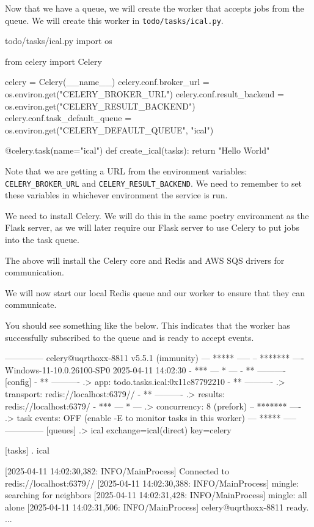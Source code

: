 \documentclass{csse4400}
\begin{document}
\noindent
Now that we have a queue,
we will create the worker that accepts jobs from the queue.
We will create this worker in \texttt{todo/tasks/ical.py}.
%
\begin{code}[language=python,numbers=none]{todo/tasks/ical.py}
import os

from celery import Celery

celery = Celery(__name__)
celery.conf.broker_url = os.environ.get("CELERY_BROKER_URL")
celery.conf.result_backend = os.environ.get("CELERY_RESULT_BACKEND")
celery.conf.task_default_queue = os.environ.get("CELERY_DEFAULT_QUEUE", "ical")

@celery.task(name="ical")
def create_ical(tasks):
    return "Hello World"
\end{code}

\noindent
Note that we are getting a URL from the environment variables:
\texttt{CELERY\_BROKER\_URL} and \texttt{CELERY\_RESULT\_BACKEND}.
We need to remember to set these variables in whichever environment the service is run.

We need to install Celery.
We will do this in the same poetry environment as the Flask server,
as we will later require our Flask server to use Celery to put jobs into the task queue.


\noindent
The above will install the Celery core and Redis and AWS SQS drivers for communication.

We will now start our local Redis queue and our worker to ensure that they can communicate.



You should see something like the below.
This indicates that the worker has successfully subscribed to the queue and is ready to accept events.
%
\begin{code}[numbers=none]{}
 -------------- celery@uqrthoxx-8811 v5.5.1 (immunity)
--- ***** -----
-- ******* ---- Windows-11-10.0.26100-SP0 2025-04-11 14:02:30
- *** --- * ---
- ** ---------- [config]
- ** ---------- .> app:         todo.tasks.ical:0x11c87792210
- ** ---------- .> transport:   redis://localhost:6379//
- ** ---------- .> results:     redis://localhost:6379/
- *** --- * --- .> concurrency: 8 (prefork)
-- ******* ---- .> task events: OFF (enable -E to monitor tasks in this worker)
--- ***** -----
 -------------- [queues]
                .> ical             exchange=ical(direct) key=celery


[tasks]
  . ical

[2025-04-11 14:02:30,382: INFO/MainProcess] Connected to redis://localhost:6379//
[2025-04-11 14:02:30,388: INFO/MainProcess] mingle: searching for neighbors
[2025-04-11 14:02:31,428: INFO/MainProcess] mingle: all alone
[2025-04-11 14:02:31,506: INFO/MainProcess] celery@uqrthoxx-8811 ready.
...
\end{code}
\end{document}
